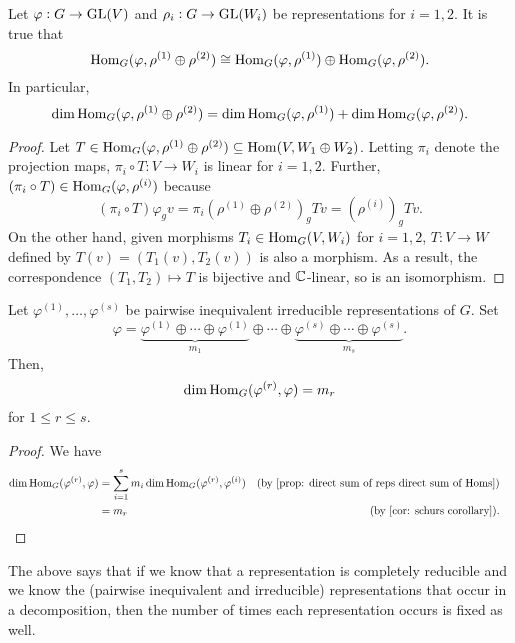 		\begin{fprop}
			\label{prop: direct sum of reps direct sum of Homs}
			Let $\varphi : G \to \operatorname{GL}(V)$ and $\rho_i : G \to \operatorname{GL}(W_i)$ be representations for $i = 1,2$. It is true that
			\[ \operatorname{Hom}_G(\varphi,\rho^{(1)} \oplus \rho^{(2)}) \cong \operatorname{Hom}_G(\varphi,\rho^{(1)}) \oplus \operatorname{Hom}_G(\varphi,\rho^{(2)}). \]
			In particular,
			\[ \dim \operatorname{Hom}_G(\varphi,\rho^{(1)} \oplus \rho^{(2)}) = \dim \operatorname{Hom}_G(\varphi,\rho^{(1)}) + \dim \operatorname{Hom}_G(\varphi,\rho^{(2)}). \]
		\end{fprop}
		\begin{proof}
			Let $T \in \operatorname{Hom}_G(\varphi,\rho^{(1)}\oplus\rho^{(2)}) \subseteq \operatorname{Hom}(V,W_1\oplus W_2)$. Letting $\pi_i$ denote the projection maps, $\pi_i \circ T : V \to W_i$ is linear for $i = 1,2$. Further, $(\pi_i \circ T) \in \operatorname{Hom}_G(\varphi,\rho^{(i)})$ because
			\[ (\pi_i \circ T) \varphi_g v = \pi_i (\rho^{(1)} \oplus \rho^{(2)})_g T v = (\rho^{(i)})_g T v. \]
			On the other hand, given morphisms $T_i \in \operatorname{Hom}_G(V,W_i)$ for $i = 1,2$, $T : V \to W$ defined by $T(v) = (T_1(v), T_2(v))$ is also a morphism. As a result, the correspondence $(T_1,T_2) \mapsto T$ is bijective and $\mathbb{C}$-linear, so is an isomorphism.
		\end{proof}

		\begin{fcor}
			Let $\varphi^{(1)},\ldots,\varphi^{(s)}$ be pairwise inequivalent irreducible representations of $G$. Set
			\[ \varphi = \underbrace{\varphi^{(1)} \oplus \cdots \oplus \varphi^{(1)}}_{m_1} \oplus \cdots \oplus \underbrace{\varphi^{(s)} \oplus \cdots \oplus \varphi^{(s)}}_{m_s}. \]
			Then,
			\[ \dim \operatorname{Hom}_G (\varphi^{(r)}, \varphi) = m_r \]
			for $1 \le r \le s$.
		\end{fcor}
		\begin{proof}
			We have
			\begin{align*}
				\dim \Hom_G (\varphi^{(r)}, \varphi) &= \sum_{i=1}^s m_i \dim \Hom_G (\varphi^{(r)},\varphi^{(i)}) & \text{(by \Cref{prop: direct sum of reps direct sum of Homs})} \\
					&= m_r & \text{(by \Cref{cor: schurs corollary})}. & \qedhere
			\end{align*}
		\end{proof}

		The above says that if we know that a representation is completely reducible and we know the (pairwise inequivalent and irreducible) representations that occur in a decomposition, then the number of times each representation occurs is fixed as well.

